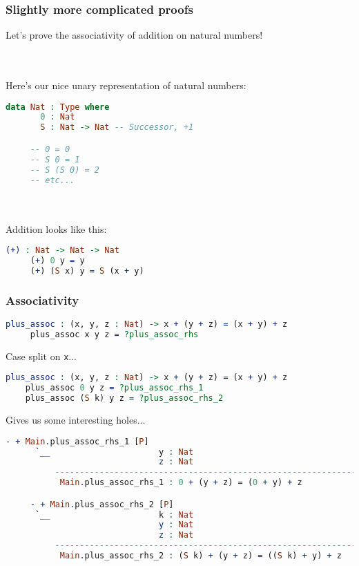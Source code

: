 \documentclass{beamer}
\begin{document}
\begin{frame}[fragile]
  \frametitle{Slightly more complicated proofs}

  Let's prove the associativity of addition on natural numbers!

  \pause \\~\\

  Here's our nice unary representation of natural numbers:

  \begin{lstlisting}[language=Idris]
     data Nat : Type where
       0 : Nat
       S : Nat -> Nat -- Successor, +1

     -- 0 = 0
     -- S 0 = 1
     -- S (S 0) = 2
     -- etc...
   \end{lstlisting}
   
   \pause \\~\\

   Addition looks like this:

   \begin{lstlisting}[language=Idris]
     (+) : Nat -> Nat -> Nat
     (+) 0 y = y
     (+) (S x) y = S (x + y)
   \end{lstlisting}
\end{frame}

\begin{frame}[fragile]
  \frametitle{Associativity}

  \begin{lstlisting}[language=Idris]
     plus_assoc : (x, y, z : Nat) -> x + (y + z) = (x + y) + z
     plus_assoc x y z = ?plus_assoc_rhs
  \end{lstlisting}

  \pause
  Case split on \texttt{x}...
  
  \begin{lstlisting}[language=Idris]
    plus_assoc : (x, y, z : Nat) -> x + (y + z) = (x + y) + z
    plus_assoc 0 y z = ?plus_assoc_rhs_1
    plus_assoc (S k) y z = ?plus_assoc_rhs_2
  \end{lstlisting}

  \pause
  Gives us some interesting holes...

  \begin{lstlisting}[language=Idris]
     - + Main.plus_assoc_rhs_1 [P]
      `__                      y : Nat
                               z : Nat
          ---------------------------------------------------------------
           Main.plus_assoc_rhs_1 : 0 + (y + z) = (0 + y) + z

     - + Main.plus_assoc_rhs_2 [P]
      `__                      k : Nat
                               y : Nat
                               z : Nat
          -----------------------------------------------------------------------
           Main.plus_assoc_rhs_2 : (S k) + (y + z) = ((S k) + y) + z
  \end{lstlisting}
\end{frame}
\end{document}
